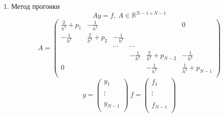 \documentclass[12pt]{article}
\begin{document}
\begin{enumerate}[I.]
\begin{enumerate}
            \newpage

            \item Метод прогонки
            \[Ay=f,\ A\in \mathbb{R}^{N-1\times N-1}\]
            \[A=
            \left(\begin{array}{cccccc}
                \frac{2}{h^2}+p_1& -\frac{1}{h^2}  &&&& 0 \\
                -\frac{1}{h^2} & \frac{2}{h^2}+p_2& -\frac{1}{h^2} &&& \\
                &&\cdots&\cdots&& \\
                &&& -\frac{1}{h^2} & \frac{2}{h^2}+p_{N-2} & -\frac{1}{h^2} \\
                0 &&&               & -\frac{1}{h^2}  & \frac{1}{h^2}+p_{N-1} \\
            \end{array}\right)\]
            \[
            y=\left(\begin{array}{c}
                y_{1}\\
                \\
                \vdots\\
                \\
                y_{N-1}\\
            \end{array}\right)\
            f=
            \left(\begin{array}{c}
                f_{1}\\
                \\
                \vdots\\
                \\
                f_{N-1}\\
            \end{array}\right)
            \]


\end{enumerate}
\end{enumerate}
\end{document}
